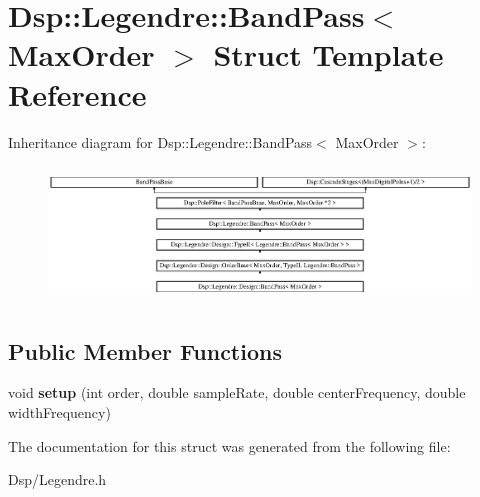 \hypertarget{structDsp_1_1Legendre_1_1BandPass}{\section{Dsp\-:\-:Legendre\-:\-:Band\-Pass$<$ Max\-Order $>$ Struct Template Reference}
\label{structDsp_1_1Legendre_1_1BandPass}
}
Inheritance diagram for Dsp\-:\-:Legendre\-:\-:Band\-Pass$<$ Max\-Order $>$\-:\begin{figure}[H]
\begin{center}
\leavevmode
\includegraphics[height=3.612903cm]{structDsp_1_1Legendre_1_1BandPass}
\end{center}
\end{figure}
\subsection*{Public Member Functions}
\begin{DoxyCompactItemize}
\item 
\hypertarget{structDsp_1_1Legendre_1_1BandPass_aad056f9e66a13bded4ee4d43d0a7e6ea}{void {\bfseries setup} (int order, double sample\-Rate, double center\-Frequency, double width\-Frequency)}\label{structDsp_1_1Legendre_1_1BandPass_aad056f9e66a13bded4ee4d43d0a7e6ea}

\end{DoxyCompactItemize}


The documentation for this struct was generated from the following file\-:\begin{DoxyCompactItemize}
\item 
Dsp/Legendre.\-h\end{DoxyCompactItemize}
